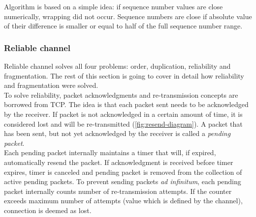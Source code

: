 \documentclass[times, utf8, diplomski]{fer}
\begin{document}
Algorithm is based on a simple idea: if sequence number values are close numerically, wrapping did not occur. Sequence numbers are close if absolute value of their difference is smaller or equal to half of the full sequence number range.


\subsubsection{Reliable channel}
Reliable channel solves all four problems: order, duplication, reliability and fragmentation. The rest of this section is going to cover in detail how reliability and fragmentation were solved.\\

To solve reliability, packet acknowledgments and re-transmission concepts are borrowed from TCP. The idea is that each packet sent needs to be acknowledged by the receiver. If packet is not acknowledged in a certain amount of time, it is considered lost and will be re-transmitted (\ref{fig:resend-diagram}). A packet that has been sent, but not yet acknowledged by the receiver is called a \textit{pending packet}. \\

Each pending packet internally maintains a timer that will, if expired, automatically resend the packet. If acknowledgment is received before timer expires, timer is canceled and pending packet is removed from the collection of active pending packets. To prevent sending packets \textit{ad infinitum}, each pending packet internally counts number of re-transmission attempts. If the counter exceeds maximum number of attempts (value which is defined by the channel), connection is deemed as lost. \\
\end{document}

